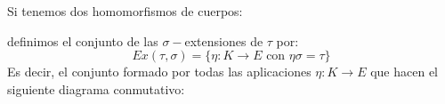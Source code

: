 \begin{definicion}
    Si tenemos dos homomorfismos de cuerpos:
    \begin{figure}[H]
        \centering
    \end{figure}
    \noindent
    definimos el conjunto de las $\sigma-$extensiones de $\tau$ por:
    \begin{equation*}
        Ex(\tau,\sigma) = \{\eta:K\to E \text{\ con\ } \eta \sigma = \tau\}
    \end{equation*}
    Es decir, el conjunto formado por todas las aplicaciones $\eta:K\to E$ que hacen el siguiente diagrama conmutativo:
    \begin{figure}[H]
        \centering
    \end{figure}
\end{definicion}

